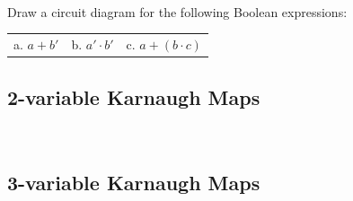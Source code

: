 \documentclass[a4paper,12pt]{book}
\newcounter{question}
\begin{document}
\begin{questionNOGRADE}{\thequestion}
\begin{center}
\begin{tabular}{c c c}
                \end{tabular}
            \end{center}

            \solution{}
            { ~\\~\\~\\ }


        \end{questionNOGRADE}

        \hrulefill

        \begin{questionNOGRADE}{\thequestion}

			Draw a circuit diagram for the following Boolean expressions:

			\begin{tabular}{p{4cm} p{4cm} p{4cm}}
				a. $a + b'$ &
				b. $a' \cdot b'$ &
				c. $a + (b \cdot c)$
			\end{tabular}


        \end{questionNOGRADE}


        \newpage

        \subsection{2-variable Karnaugh Maps}

        \begin{intro}{\ }
        \end{intro}

        \subsection{3-variable Karnaugh Maps}

        \begin{intro}{\ }
        \end{intro}
\end{document}
